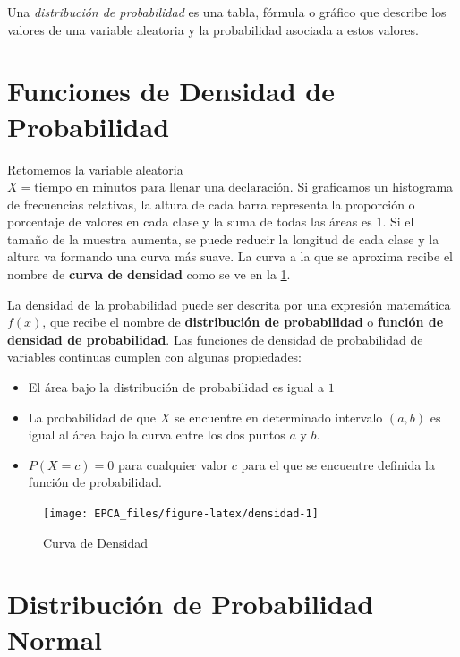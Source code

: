 \documentclass[
]{krantz}
\providecommand{\tightlist}{%
  \setlength{\itemsep}{0pt}\setlength{\parskip}{0pt}}
\begin{document}
Una \emph{distribución de probabilidad} es una tabla, fórmula o gráfico que describe los valores de una variable aleatoria y la probabilidad asociada a estos valores.

\hypertarget{funciones-de-densidad-de-probabilidad}{%
\section{Funciones de Densidad de Probabilidad}\label{funciones-de-densidad-de-probabilidad}}

Retomemos la variable aleatoria \(X= \text{tiempo en minutos para llenar una declaración}\). Si graficamos un histograma de frecuencias relativas, la altura de cada barra representa la proporción o porcentaje de valores en cada clase y la suma de todas las áreas es \(1\). Si el tamaño de la muestra aumenta, se puede reducir la longitud de cada clase y la altura va formando una curva más suave. La curva a la que se aproxima recibe el nombre de \textbf{curva de densidad} como se ve en la \ref{fig:densidad}.

La densidad de la probabilidad puede ser descrita por una expresión matemática \(f\left(x\right)\), que recibe el nombre de \textbf{distribución de probabilidad} o \textbf{función de densidad de probabilidad}. Las funciones de densidad de probabilidad de variables continuas cumplen con algunas propiedades:

\begin{itemize}
\tightlist
\item
  El área bajo la distribución de probabilidad es igual a \(1\)
\item
  La probabilidad de que \(X\) se encuentre en determinado intervalo \(\left(a,b\right)\) es igual al área bajo la curva entre los dos puntos \(a\) y \(b\).
\item
  \(P\left(X=c\right)=0\) para cualquier valor \(c\) para el que se encuentre definida la función de probabilidad.
\end{itemize}

\begin{figure}[h!]

{\centering \texttt{[image: EPCA\_files/figure-latex/densidad-1]} 

}

\caption{Curva de Densidad}\label{fig:densidad}
\end{figure}

\hypertarget{distribucion-de-probabilidad-normal}{%
\section{Distribución de Probabilidad Normal}\label{distribucion-de-probabilidad-normal}}
\end{document}
